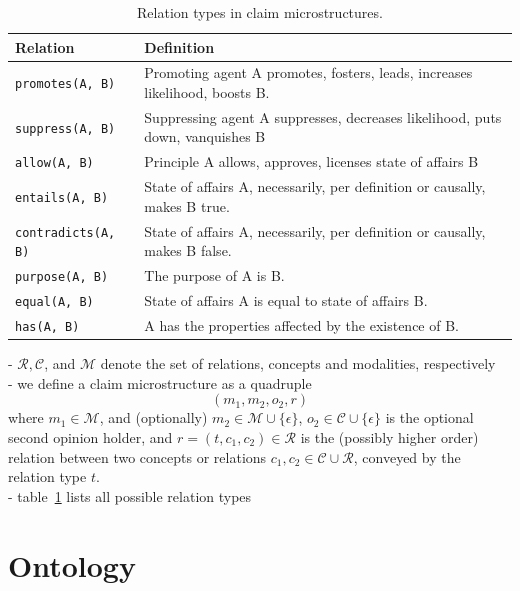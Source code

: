 \begin{table}
{\footnotesize
\begin{tabular}{lp{}}
\toprule
\textbf{Relation} & \textbf{Definition} \\
\midrule
\texttt{promotes(A, B)} & Promoting agent A promotes, fosters, leads, increases likelihood, boosts B.  \\
\texttt{suppress(A, B)} & Suppressing agent A suppresses, decreases likelihood, puts down, vanquishes B \\
\midrule
\texttt{allow(A, B)} & Principle A allows, approves, licenses state of affairs B \\
\midrule
\texttt{entails(A, B)} & State of affairs A, necessarily, per definition or causally, makes B true. \\
\texttt{contradicts(A, B)} & State of affairs A, necessarily, per definition or causally, makes B false. \\
\midrule
\texttt{purpose(A, B)} & The purpose of A is B. \\
\midrule
\texttt{equal(A, B)} & State of affairs A is equal to state of affairs B. \\
\midrule
\texttt{has(A, B)} & A has the properties affected by the existence of B.  \\
\bottomrule
\end{tabular}}
\caption{Relation types in claim microstructures.}
\label{tab:microstructures_relations}
\end{table}

\noindent - $\mathcal{R}, \mathcal{C}$, and $\mathcal{M}$ denote the set of relations, concepts and
modalities, respectively \\
- we define a claim microstructure as a quadruple 
$$
(m_1, m_2, o_2, r)
$$ 
where $m_1 \in \mathcal{M}$, and (optionally) $m_2 \in \mathcal{M} \cup \{\epsilon\}$,
$o_2 \in \mathcal{C} \cup \{\epsilon\}$ is the optional second opinion holder, and 
$r = (t, c_1, c_2) \in \mathcal{R}$ is the (possibly higher order) relation 
between two concepts or relations $c_1, c_2 \in \mathcal{C} \cup \mathcal{R}$, 
conveyed by the relation type $t$. \\
- table~\ref{tab:microstructures_relations} lists all possible relation types \\

\section{Ontology}

